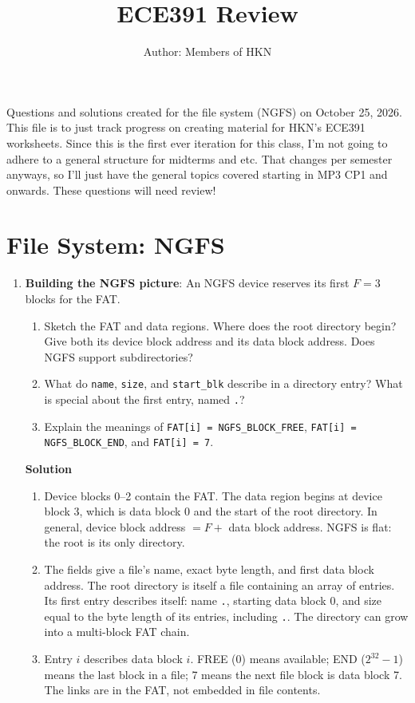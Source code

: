 \documentclass{article}
\title{ECE391 Review}
\author{Author: Members of HKN}
\date{}
\newenvironment{solution}{\par\medskip\noindent\textbf{Solution}\par\smallskip}{\par}
\begin{document}
\maketitle
\noindent Questions and solutions created for the file system (NGFS) on October 25, 2026. This file is to just track progress on creating material for HKN's ECE391 worksheets. Since this is the first ever iteration for this class, I'm not going to adhere to a general structure for midterms and etc. That changes per semester anyways, so I'll just have the general topics covered starting in MP3 CP1 and onwards. These questions will need review!

\section{File System: NGFS}
\begin{enumerate}
\item \textbf{Building the NGFS picture}: An NGFS device reserves its first
$F=3$ blocks for the FAT.
\begin{enumerate}
\item Sketch the FAT and data regions. Where does the root directory begin?
Give both its device block address and its data block address. Does NGFS support
subdirectories?
\item What do \texttt{name}, \texttt{size}, and \texttt{start\_blk} describe in a
directory entry? What is special about the first entry, named \texttt{.}?
\item Explain the meanings of \texttt{FAT[i] = NGFS\_BLOCK\_FREE},
\texttt{FAT[i] = NGFS\_BLOCK\_END}, and \texttt{FAT[i] = 7}.
\end{enumerate}
\begin{solution}
\begin{enumerate}
\item Device blocks 0--2 contain the FAT. The data region begins at device
block 3, which is data block 0 and the start of the root directory.
In general, device block address $=F+$ data block address. NGFS is flat:
the root is its only directory.
\item The fields give a file's name, exact byte length, and first data block
address. The root directory is itself a file containing an array of entries.
Its first entry describes itself: name \texttt{.}, starting data block 0,
and size equal to the byte length of its entries, including \texttt{.}.
The directory can grow into a multi-block FAT chain.
\item Entry $i$ describes data block $i$. FREE (0) means available; END
($2^{32}-1$) means the last block in a file; 7 means the next file block is
data block 7. The links are in the FAT, not embedded in file contents.
\end{enumerate}
\end{solution}


\end{enumerate}
\end{document}

